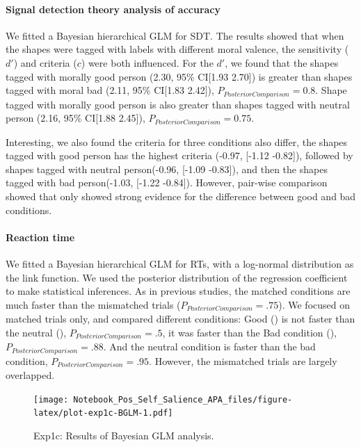 \documentclass[
  english,
  man]{apa6}
\let\oldparagraph\paragraph
\renewcommand{\paragraph}[1]{\oldparagraph{#1}\mbox{}}
\begin{document}
\hypertarget{signal-detection-theory-analysis-of-accuracy-1}{%
\paragraph{Signal detection theory analysis of accuracy}\label{signal-detection-theory-analysis-of-accuracy-1}}

We fitted a Bayesian hierarchical GLM for SDT. The results showed that when the shapes were tagged with labels with different moral valence, the sensitivity (\(d'\)) and criteria (\(c\)) were both influenced. For the \(d'\), we found that the shapes tagged with morally good person (2.30, 95\% CI{[}1.93 2.70{]}) is greater than shapes tagged with moral bad (2.11, 95\% CI{[}1.83 2.42{]}), \(P_{PosteriorComparison} = 0.8\). Shape tagged with morally good person is also greater than shapes tagged with neutral person (2.16, 95\% CI{[}1.88 2.45{]}), \(P_{PosteriorComparison} = 0.75\).

Interesting, we also found the criteria for three conditions also differ, the shapes tagged with good person has the highest criteria (-0.97, {[}-1.12 -0.82{]}), followed by shapes tagged with neutral person(-0.96, {[}-1.09 -0.83{]}), and then the shapes tagged with bad person(-1.03, {[}-1.22 -0.84{]}). However, pair-wise comparison showed that only showed strong evidence for the difference between good and bad conditions.

\hypertarget{reaction-time-2}{%
\paragraph{Reaction time}\label{reaction-time-2}}

We fitted a Bayesian hierarchical GLM for RTs, with a log-normal distribution as the link function. We used the posterior distribution of the regression coefficient to make statistical inferences. As in previous studies, the matched conditions are much faster than the mismatched trials (\(P_{PosteriorComparison} = .75\)). We focused on matched trials only, and compared different conditions: Good () is not faster than the neutral (), \(P_{PosteriorComparison} = .5\), it was faster than the Bad condition (), \(P_{PosteriorComparison} = .88\). And the neutral condition is faster than the bad condition, \(P_{PosteriorComparison} = .95\). However, the mismatched trials are largely overlapped.

\begin{figure}
\centering
\texttt{[image: Notebook\_Pos\_Self\_Salience\_APA\_files/figure-latex/plot-exp1c-BGLM-1.pdf]}
\caption{\label{fig:plot-exp1c-BGLM}Exp1c: Results of Bayesian GLM analysis.}
\end{figure}
\end{document}
